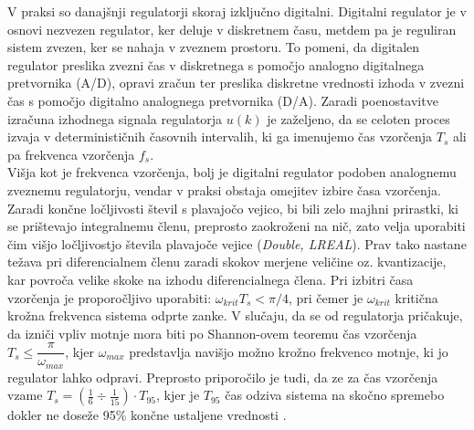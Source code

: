 \documentclass[a4paper,twoside,openright,12pt]{book}
\begin{document}
V praksi so danajšnji regulatorji skoraj izključno digitalni. Digitalni regulator je v osnovi nezvezen regulator, ker deluje v diskretnem času, metdem pa je reguliran sistem zvezen, ker se nahaja v zveznem prostoru.  To pomeni, da digitalen regulator preslika zvezni čas v diskretnega s pomočjo  analogno digitalnega pretvornika (A/D), opravi zračun ter preslika diskretne vrednosti izhoda v zvezni čas s pomočjo digitalno analognega pretvornika (D/A). Zaradi poenostavitve izračuna izhodnega signala regulatorja {$u(k)$ je zaželjeno, da se celoten proces izvaja v determinističnih časovnih intervalih, ki ga imenujemo čas vzorčenja $T_s$ ali pa frekvenca vzorčenja $f_s$.\\

	Višja kot je frekvenca vzorčenja, bolj je digitalni regulator podoben analognemu zveznemu regulatorju, vendar v praksi obstaja omejitev izbire časa vzorčenja. Zaradi končne ločljivosti števil s plavajočo vejico, bi bili zelo majhni prirastki, ki se prištevajo integralnemu členu, preprosto zaokroženi na nič, zato velja uporabiti čim višjo ločljivostjo števila plavajoče vejice (\textit{Double, LREAL}). Prav tako nastane težava pri diferencialnem členu zaradi skokov merjene veličine oz. kvantizacije, kar povroča velike skoke na izhodu diferencialnega člena. Pri izbitri časa vzorčenja je proporočljivo uporabiti: $\omega_{krit}T_s<\pi/4$, pri čemer je $\omega_{krit}$ kritična krožna frekvenca sistema odprte zanke. V slučaju, da se od regulatorja pričakuje, da izniči vpliv motnje mora biti po Shannon-ovem teoremu čas vzorčenja $T_s\leq\dfrac{\pi}{\omega_{max}}$, kjer $\omega_{max}$ predstavlja navišjo možno krožno frekvenco motnje, ki jo regulator lahko odpravi. Preprosto priporočilo je tudi, da ze za čas vzorčenja vzame $T_s=(\frac{1}{6}\div\frac{1}{15})\cdot T_{95}$, kjer je $T_{95}$ čas odziva sistema na skočno spremebo dokler ne doseže 95\%  končne ustaljene vrednosti \cite{bobal2006digital}.\\
}
\end{document}
